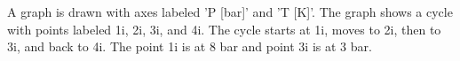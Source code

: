 A graph is drawn with axes labeled 'P [bar]' and 'T [K]'. The graph shows a cycle with points labeled 1i, 2i, 3i, and 4i. The cycle starts at 1i, moves to 2i, then to 3i, and back to 4i. The point 1i is at 8 bar and point 3i is at 3 bar.